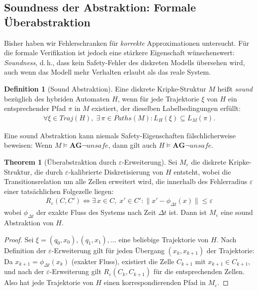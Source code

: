 ﻿\documentclass[a4paper,12pt]{article}
\theoremstyle{definition}
\newtheorem{definition}{Definition}[section]
\newtheorem{theorem}{Theorem}[section]
\begin{document}
\subsection{Soundness der Abstraktion: Formale Überabstraktion}

Bisher haben wir Fehlerschranken für \emph{korrekte} Approximationen untersucht. Für die formale Verifikation ist jedoch eine stärkere Eigenschaft wünschenswert: \emph{Soundness}, d.\,h., dass kein Safety-Fehler des diskreten Modells übersehen wird, auch wenn das Modell mehr Verhalten erlaubt als das reale System.

\begin{definition}[Sound Abstraktion]
Eine diskrete Kripke-Struktur $M$ heißt \emph{sound} bezüglich des hybriden Automaten $H$, wenn für jede Trajektorie $\xi$ von $H$ ein entsprechender Pfad $\pi$ in $M$ existiert, der dieselben Labelbedingungen erfüllt:
\begin{align}
  \forall \xi \in \mathit{Traj}(H),\; \exists\, \pi \in \mathit{Paths}(M)\colon L_H(\xi) \subseteq L_M(\pi).
\end{align}
\end{definition}

Eine sound Abstraktion kann niemals Safety-Eigenschaften fälschlicherweise beweisen: Wenn $M \models \mathbf{AG}\neg\mathit{unsafe}$, dann gilt auch $H \models \mathbf{AG}\neg\mathit{unsafe}$.

\begin{theorem}[Überabstraktion durch $\varepsilon$-Erweiterung]
\label{thm:soundness}
Sei $M_\varepsilon$ die diskrete Kripke-Struktur, die durch $\varepsilon$-kalibrierte Diskretisierung von $H$ entsteht, wobei die Transitionsrelation um alle Zellen erweitert wird, die innerhalb des Fehlerradius $\varepsilon$ einer tatsächlichen Folgezelle liegen:
\begin{align}
  R_\varepsilon(C, C') \iff \exists\, x \in C,\; x' \in C'\colon \|x' - \phi_{\Delta t}(x)\| \leq \varepsilon
\end{align}
wobei $\phi_{\Delta t}$ der exakte Fluss des Systems nach Zeit $\Delta t$ ist. Dann ist $M_\varepsilon$ eine sound Abstraktion von $H$.
\end{theorem}

\begin{proof}
Sei $\xi = (q_0, x_0), (q_1, x_1), \ldots$ eine beliebige Trajektorie von $H$. Nach Definition der $\varepsilon$-Erweiterung gilt für jeden Übergang $(x_k, x_{k+1})$ der Trajektorie: Da $x_{k+1} = \phi_{\Delta t}(x_k)$ (exakter Fluss), existiert die Zelle $C_{k+1}$ mit $x_{k+1} \in C_{k+1}$, und nach der $\varepsilon$-Erweiterung gilt $R_\varepsilon(C_k, C_{k+1})$ für die entsprechenden Zellen. Also hat jede Trajektorie von $H$ einen korrespondierenden Pfad in $M_\varepsilon$.
\end{proof}
\end{document}
